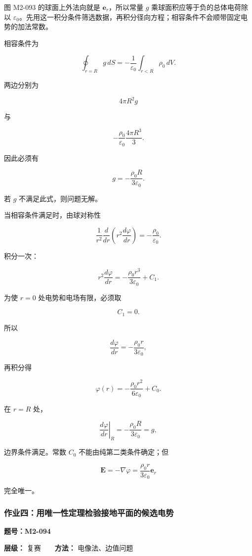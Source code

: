 图 M2-093 的球面上外法向就是 \(\mathbf e_r\)，所以常量 \(g\)
乘球面积应等于负的总体电荷除以
\(\varepsilon_0\)。先用这一积分条件筛选数据，再积分径向方程；相容条件不会顺带固定电势的加法常数。

相容条件为

\[
\oint_{r=R}g\,dS
=-\frac1{\varepsilon_0}
\int_{r<R}\rho_0\,dV.
\]

两边分别为

\[
4\pi R^2g
\]

与

\[
-\frac{\rho_0}{\varepsilon_0}
\frac{4\pi R^3}{3}.
\]

因此必须有

\[
\boxed{
g=-\frac{\rho_0R}{3\varepsilon_0}
}.
\]

若 \(g\) 不满足此式，则问题无解。

当相容条件满足时，由球对称性

\[
\frac1{r^2}\frac d{dr}
\left(r^2\frac{d\varphi}{dr}\right)
=-\frac{\rho_0}{\varepsilon_0}.
\]

积分一次：

\[
r^2\frac{d\varphi}{dr}
=-\frac{\rho_0r^3}{3\varepsilon_0}+C_1.
\]

为使 \(r=0\) 处电势和电场有限，必须取

\[
C_1=0.
\]

所以

\[
\frac{d\varphi}{dr}
=-\frac{\rho_0r}{3\varepsilon_0},
\]

再积分得

\[
\boxed{
\varphi(r)
=-\frac{\rho_0r^2}{6\varepsilon_0}+C_0
}.
\]

在 \(r=R\) 处，

\[
\left.\frac{d\varphi}{dr}\right|_R
=-\frac{\rho_0R}{3\varepsilon_0}=g,
\]

边界条件满足。常数 \(C_0\) 不能由纯第二类条件确定；但

\[
\mathbf E
=-\nabla\varphi
=\frac{\rho_0r}{3\varepsilon_0}\mathbf e_r
\]

完全唯一。

\subsubsection{作业四：用唯一性定理检验接地平面的候选电势}\label{m2:ux4f5cux4e1aux56dbux7528ux552fux4e00ux6027ux5b9aux7406ux68c0ux9a8cux63a5ux5730ux5e73ux9762ux7684ux5019ux9009ux7535ux52bf}

\textbf{题号：M2-094}

\textbf{层级：} 复赛　　\textbf{方法：} 电像法、边值问题

